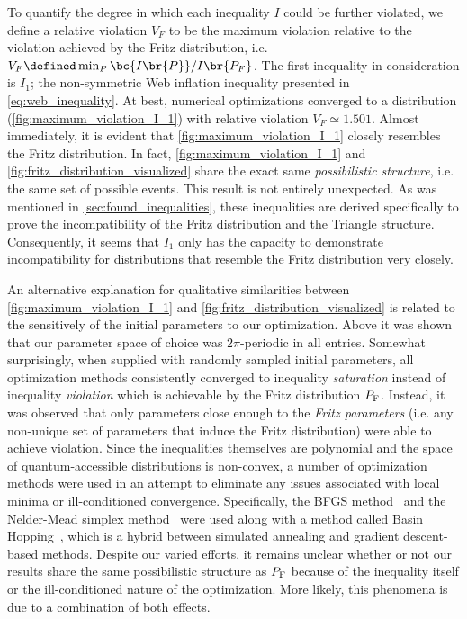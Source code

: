 \documentclass[aps, 10pt, english, twoside, pra, nofootinbib, tightenlines, longbibliography, superscriptaddress]{revtex4-1}
\begin{document}
    To quantify the degree in which each inequality $I$ could be further violated, we define a relative violation $V_F$ to be the maximum violation relative to the violation achieved by the Fritz distribution, i.e. $V_F \defined \min_{P}\bc{I\br{P}}/I\br{P_F}$. The first inequality in consideration is $I_1$; the non-symmetric Web inflation inequality presented in \cref{eq:web_inequality}. At best, numerical optimizations converged to a distribution (\cref{fig:maximum_violation_I_1}) with relative violation $V_F \simeq 1.501$. Almost immediately, it is evident that \cref{fig:maximum_violation_I_1} closely resembles the Fritz distribution. In fact, \cref{fig:maximum_violation_I_1} and \cref{fig:fritz_distribution_visualized} share the exact same \textit{possibilistic structure}, i.e. the same set of possible events. This result is not entirely unexpected. As was mentioned in \cref{sec:found_inequalities}, these inequalities are derived specifically to prove the incompatibility of the Fritz distribution and the Triangle structure. Consequently, it seems that $I_1$ only has the capacity to demonstrate incompatibility for distributions that resemble the Fritz distribution very closely.

    An alternative explanation for qualitative similarities between \cref{fig:maximum_violation_I_1} and \cref{fig:fritz_distribution_visualized} is related to the sensitively of the initial parameters to our optimization. Above it was shown that our parameter space of choice was $2\pi$-periodic in all entries. Somewhat surprisingly, when supplied with randomly sampled initial parameters, all optimization methods consistently converged to inequality \textit{saturation} instead of inequality \textit{violation} which is achievable by the Fritz distribution $\prob[\fritz]$. Instead, it was observed that only parameters close enough to the \textit{Fritz parameters} (i.e. any non-unique set of parameters that induce the Fritz distribution) were able to achieve violation. Since the inequalities themselves are polynomial and the space of quantum-accessible distributions is non-convex, a number of optimization methods were used in an attempt to eliminate any issues associated with local minima or ill-conditioned convergence. Specifically, the BFGS method~\cite[p.142]{Nocedal_2000} and the Nelder-Mead simplex method~\cite[p.238]{Nocedal_2000} were used along with a method called Basin Hopping~\cite{Wales_1997}, which is a hybrid between simulated annealing and gradient descent-based methods. Despite our varied efforts, it remains unclear whether or not our results share the same possibilistic structure as $\prob[\fritz]$ because of the inequality itself or the ill-conditioned nature of the optimization. More likely, this phenomena is due to a combination of both effects.
\end{document}
